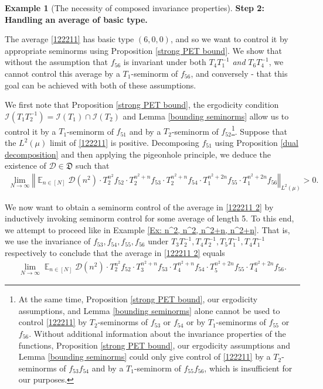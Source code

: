 \documentclass[11pt]{amsart}
\theoremstyle{definition}
\newtheorem{example}{Example}
\newcommand{\CD}{{\mathcal D}}
\newcommand{\CI}{{\mathcal I}}
\newcommand{\FD}{{\mathfrak D}}
\newcommand{\norm}[1]{\left\Vert #1\right\Vert}
\newcommand{\inv}{^{-1}}
\DeclareMathOperator*{\E}{\mathbb{E}}
\begin{document}
\begin{example}[The necessity of composed invariance properties]
\smallskip
\textbf{Step 2: Handling an average of basic type.}
\smallskip

The average \eqref{122211} has basic type $(6, 0, 0)$, and so we want to control it by appropriate seminorms using Proposition \ref{strong PET bound}.  We show that without the assumption that $f_{56}$ is invariant under both $T_4T_1\inv$ \textit{and} $T_6T_4\inv$, we cannot control this average by a $T_1$-seminorm of $f_{56}$, and conversely - that this goal can be achieved with both of these assumptions.

We first note that Proposition \ref{strong PET bound}, the ergodicity condition $\CI(T_1 T_2\inv) = \CI(T_1)\cap\CI(T_2)$ and Lemma \ref{bounding seminorms} allow us to control it by a $T_1$-seminorm of $f_{51}$ and by a $T_2$-seminorm of $f_{52}$\footnote{At the same time, Proposition \ref{strong PET bound}, our ergodicity assumptions, and Lemma \ref{bounding seminorms} alone cannot be used to control \eqref{122211} by $T_2$-seminorms of $f_{53}$ or $f_{54}$ or by $T_1$-seminorms of $f_{55}$ or $f_{56}$. Without additional information about the invariance properties of the functions, Proposition \ref{strong PET bound}, our ergodicity assumptions and Lemma \ref{bounding seminorms} could only give control of \eqref{122211} by a $T_2$-seminorms of $f_{53}f_{54}$ and by a $T_1$-seminorm of $f_{55}f_{56}$, which is insufficient for our purposes.}. Suppose that the $L^2(\mu)$ limit of \eqref{122211} is positive. Decomposing $f_{51}$ using Proposition \ref{dual decomposition} and then applying the pigeonhole principle, we deduce the existence of $\CD\in\FD$ such that
\begin{align}\label{122211 2}
    \lim_{N\to\infty}\norm{\E_{n\in[N]}\CD(n^2)\cdot T_2^{n^2}f_{52}\cdot T_2^{n^2+n}f_{53}\cdot T_2^{n^2+n}f_{54} \cdot T_1^{n^2+2n}f_{55}\cdot T_1^{n^2+2n}f_{56}}_{L^2(\mu)}>0.
\end{align}

We now want to obtain a seminorm control of the average in \eqref{122211 2} by inductively invoking seminorm control for some average of length 5. To this end, we attempt to proceed like in Example \ref{Ex: n^2, n^2, n^2+n, n^2+n}. That is, we use the invariance of $f_{53}, f_{54}, f_{55}, f_{56}$ under $T_3T_2\inv, T_4T_2\inv, T_5T_1\inv, T_4 T_1\inv$ respectively to conclude that the average in \eqref{122211 2} equals
\begin{align}\label{122211 3}
    \lim_{N\to\infty}\E_{n\in[N]}\CD(n^2)\cdot T_2^{n^2}f_{52}\cdot T_3^{n^2+n}f_{53}\cdot T_4^{n^2+n}f_{54} \cdot T_5^{n^2+2n}f_{55}\cdot T_4^{n^2+2n}f_{56}.
\end{align}


\end{example}
\end{document}
